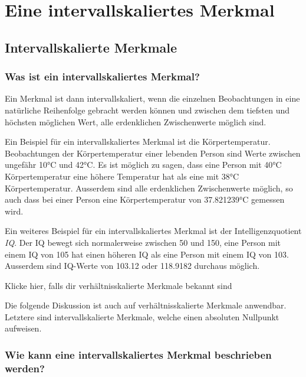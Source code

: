 \documentclass[
]{book}
\theoremstyle{definition}
\theoremstyle{definition}
\theoremstyle{definition}
\theoremstyle{definition}
\theoremstyle{remark}
\begin{document}
\part{Eine intervallskaliertes Merkmal}\label{part-eine-intervallskaliertes-merkmal}

\chapter{Intervallskalierte Merkmale}\label{intervallskalierte-merkmale}

\section{Was ist ein intervallskaliertes Merkmal?}\label{was-ist-ein-intervallskaliertes-merkmal}

Ein Merkmal ist dann intervallskaliert, wenn die einzelnen Beobachtungen in eine natürliche Reihenfolge gebracht werden können und zwischen dem tiefsten und höchsten möglichen Wert, alle erdenklichen Zwischenwerte möglich sind.

Ein Beispiel für ein intervallskaliertes Merkmal ist die Körpertemperatur. Beobachtungen der Körpertemperatur einer lebenden Person sind Werte zwischen ungefähr 10°C und 42°C. Es ist möglich zu sagen, dass eine Person mit 40°C Körpertemperatur eine höhere Temperatur hat als eine mit 38°C Körpertemperatur. Ausserdem sind alle erdenklichen Zwischenwerte möglich, so auch dass bei einer Person eine Körpertemperatur von 37.821239°C gemessen wird.

Ein weiteres Beispiel für ein intervallskaliertes Merkmal ist der Intelligenzquotient \emph{IQ}. Der IQ bewegt sich normalerweise zwischen 50 und 150, eine Person mit einem IQ von 105 hat einen höheren IQ als eine Person mit einem IQ von 103. Ausserdem sind IQ-Werte von 103.12 oder 118.9182 durchaus möglich.

Klicke hier, falls dir verhältnisskalierte Merkmale bekannt sind

Die folgende Diskussion ist auch auf verhältnisskalierte Merkmale anwendbar. Letztere sind intervallskalierte Merkmale, welche einen absoluten Nullpunkt aufweisen.

\section{Wie kann eine intervallskaliertes Merkmal beschrieben werden?}\label{wie-kann-eine-intervallskaliertes-merkmal-beschrieben-werden}
\end{document}
